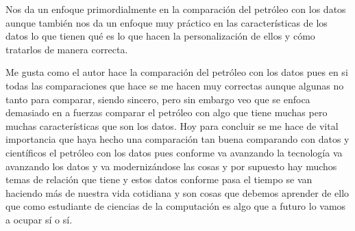 Nos da un enfoque primordialmente en la comparación del petróleo con los datos aunque también nos da un enfoque muy práctico en las características de los datos lo que tienen qué es lo que hacen la personalización de ellos y cómo tratarlos de manera correcta.


Me gusta como el autor hace la comparación del petróleo con los datos pues en si todas las comparaciones que hace se me hacen muy correctas aunque algunas no tanto para comparar, siendo sincero, pero sin embargo veo que se enfoca demasiado en a fuerzas comparar el petróleo con algo que tiene muchas pero muchas características que son los datos.
Hoy para concluir se me hace de vital importancia que haya hecho una comparación tan buena comparando con datos y científicos el petróleo con los datos pues conforme va avanzando la tecnología va avanzando los datos y va modernizándose las cosas y por supuesto hay muchos temas de relación que tiene y estos datos conforme pasa el tiempo se van haciendo más de nuestra vida cotidiana y son cosas que debemos aprender de ello que como estudiante de ciencias de la computación es algo que a futuro lo vamos a ocupar sí o sí.
